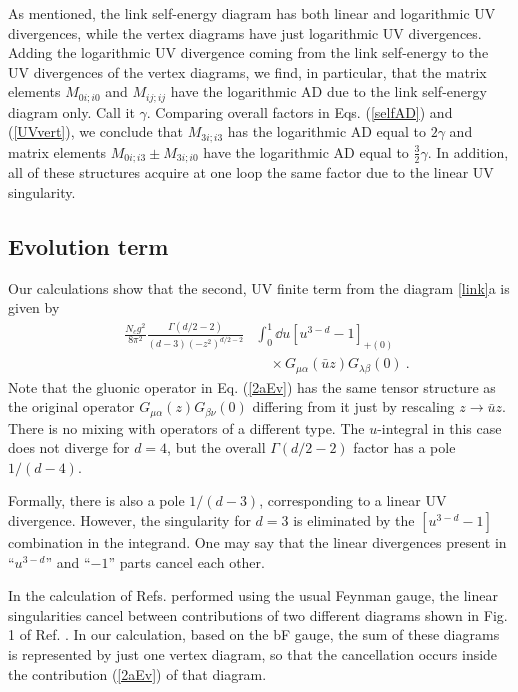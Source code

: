 As mentioned, the link self-energy diagram has both linear and logarithmic
UV divergences, while the vertex diagrams have just logarithmic
UV divergences.
Adding the logarithmic UV divergence coming from the link self-energy
to the UV divergences of the vertex diagrams, we find, in particular, that
the matrix elements ${ M}_{0 i; i 0}$ and ${ M}_{i j; i j}$ have the logarithmic AD due to the link self-energy diagram only.
Call it $\gamma$.
Comparing overall factors in Eqs. (\ref{selfAD}) and (\ref{UVvert}), we conclude that
${ M}_{3 i; i 3}$ has the logarithmic AD equal to $2 \gamma$ and matrix elements
\mbox{${ M}_{0 i; i 3} \pm
{ M}_{3 i; i 0}$} have the logarithmic AD equal to $\frac32 \gamma$.
In addition, all of these structures acquire at one loop the same factor due to the linear UV singularity.

\subsection{Evolution term}

Our calculations show that the second, UV finite term from the diagram \ref{link}a is given by
\begin{align}
\quad \frac{N_c g^2}{8\pi^2} \frac{\Gamma(d/2-2)}{({d-3})(-z^2)^{d/2-2}} &
\int_0^1 \dd u \left[u^{3-d}-1\right]_{+(0)} \nonumber
\\ &\quad \times
G_{\mu\alpha}( \bar uz) G_{\lambda \beta }( 0) \ .
\label{2aEv}
\end{align}
Note that the gluonic operator in Eq. (\ref{2aEv})
has the same tensor structure as the original operator
$G_{\mu\alpha}( z) G_{\beta \nu}( 0)$ differing from it just by
rescaling $z \to \bar u z$.
There is no mixing with operators of a different type.
The $u$-integral in this case does not diverge for $d=4$, but the overall
\mbox{$\Gamma(d/2-2)$} factor has a pole $1/(d-4)$.

Formally, there is also a pole $1/(d-3)$,
corresponding to a linear UV divergence.
However, the singularity
for $d=3$ is eliminated by the $\left [u^{3-d}-1\right ]$ combination in the integrand.
One may say that the linear divergences present in ``$u^{3-d}$'' and ``$-1$''
parts cancel each other.

In the calculation of Refs.\cite{Zhang:2018diq,Wang:2019tgg} performed using the usual Feynman gauge,
the linear singularities cancel between contributions
of two different diagrams shown in Fig. 1 of Ref. \cite{Wang:2019tgg}.
In our calculation, based on the bF gauge,
the sum of these diagrams is represented by just one vertex diagram,
so that the cancellation
occurs inside the contribution (\ref{2aEv}) of that diagram.

